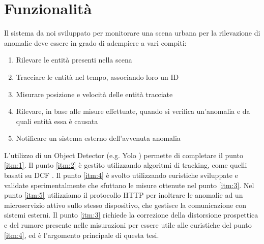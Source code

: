 \chapter{Funzionalità}
\label{sec:funzionalita}

Il sistema da noi sviluppato per monitorare una scena urbana per la rilevazione di anomalie deve essere in grado di adempiere a vari compiti:
\begin{enumerate}
    \item \label{itm:1} Rilevare le entità presenti nella scena
    \item \label{itm:2} Tracciare le entità nel tempo, associando loro un ID
    \item \label{itm:3} Misurare posizione e velocità delle entità tracciate
    \item \label{itm:4} Rilevare, in base alle misure effettuate, quando si verifica un'anomalia e da quali entità essa è causata
    \item \label{itm:5} Notificare un sistema esterno dell'avvenuta anomalia
\end{enumerate}

L'utilizzo di un Object Detector (e.g. Yolo \cite{arch:yolo}) permette di completare il punto \ref{itm:1}.
Il punto \ref{itm:2} è gestito utilizzando algoritmi di tracking, come quelli basati su DCF \cite{dcf}.
Il punto \ref{itm:4} è svolto utilizzando euristiche sviluppate e validate sperimentalmente che sfuttano le misure ottenute nel punto \ref{itm:3}. 
Nel punto \ref{itm:5} utilizziamo il protocollo HTTP per inoltrare le anomalie ad un microservizio attivo sullo stesso dispositivo, che gestisce la comunicazione con sistemi esterni.
Il punto \ref{itm:3} richiede la correzione della distorsione prospettica e del rumore presente nelle misurazioni per essere utile alle euristiche del punto \ref{itm:4}, ed è l'argomento principale di questa tesi.

